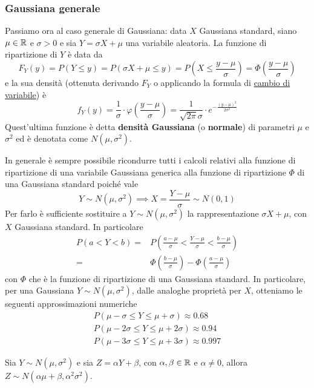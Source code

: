 \subsubsection{Gaussiana generale}
Passiamo ora al caso generale di Gaussiana: data $X$ Gaussiana standard, siano $\mu \in \mathbb{R}$ e
$\sigma > 0$ e sia $Y = \sigma X + \mu$ una variabile aleatoria. La funzione di ripartizione di
$Y$ è data da
\[
	F_Y(y) = P(Y \leq y) = P(\sigma X + \mu \leq y)
	= P\left(X \leq \frac{y - \mu}{\sigma}\right)
	= \Phi \left(\frac{y - \mu}{\sigma}\right)
\]
e la sua densità (ottenuta derivando $F_Y$ o applicando la formula di
\hyperref[prop: cambio_var]{cambio di variabile}) è
\[
	f_Y(y) = \frac{1}{\sigma} \cdot \varphi \left(\frac{y - \mu}{\sigma}\right) =
	\frac{1}{\sqrt{2 \pi} \sigma} \cdot e^{-\frac{(y - \mu)^2}{2 \sigma^2}}
\]
Quest'ultima funzione è detta \textbf{densità Gaussiana} (o \textbf{normale}) di parametri $\mu$ e
$\sigma^2$ ed è denotata come $N(\mu, \sigma^2)$.

\label{standardizzazione}
In generale è sempre possibile ricondurre tutti i calcoli relativi alla funzione di ripartizione
di una variabile Gaussiana generica alla funzione di ripartizione $\Phi$ di una Gaussiana standard
poiché vale
\[ Y \sim N(\mu, \sigma^2) \implies X = \frac{Y - \mu}{\sigma} \sim N(0,1) \]
Per farlo è sufficiente sostituire a $Y \sim N(\mu, \sigma^2)$ la rappresentazione $\sigma X + \mu$,
con $X$ Gaussiana standard. In particolare
\begin{align*}
	P(a < Y < b) = & P \left( \frac{a - \mu}{\sigma} < \frac{Y - \mu}{\sigma}
	< \frac{b - \mu}{\sigma} \right)                                          \\
	=              & \Phi \left( \frac{b - \mu}{\sigma} \right) -
	\Phi \left( \frac{a - \mu}{\sigma} \right)
\end{align*}
con $\Phi$ che è la funzione di ripartizione di una Gaussiana standard. In particolare, per una
Gaussiana $Y \sim N(\mu, \sigma^2)$, dalle analoghe proprietà per $X$, otteniamo le seguenti
approssimazioni numeriche
\begin{gather*}
	P(\mu - \sigma \leq Y \leq \mu + \sigma) \approx 0.68 \\
	P(\mu - 2 \sigma \leq Y \leq \mu + 2 \sigma) \approx 0.94 \\
	P(\mu - 3 \sigma \leq Y \leq \mu + 3 \sigma) \approx 0.997
\end{gather*}

\begin{theorem}[Riproducibilità]\label{th: riprod_gauss}
	Sia $Y \sim N(\mu, \sigma^2)$ e sia $Z = \alpha Y + \beta$, con $\alpha, \beta \in \mathbb{R}$ e
	$\alpha \neq 0$, allora $Z \sim N(\alpha \mu + \beta, \alpha^2 \sigma^2)$.
\end{theorem}
